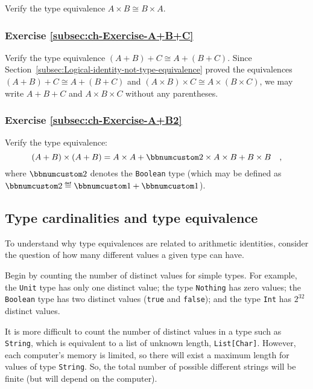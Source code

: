 Verify the type equivalence $A\times B\cong B\times A$.

\subsubsection{Exercise \label{subsec:ch-Exercise-A+B+C}\ref{subsec:ch-Exercise-A+B+C}}

Verify the type equivalence $\left(A+B\right)+C\cong A+\left(B+C\right)$.
Since Section~\ref{subsec:Logical-identity-not-type-equivalence}
proved the equivalences $\left(A+B\right)+C\cong A+\left(B+C\right)$
and $\left(A\times B\right)\times C\cong A\times\left(B\times C\right)$,
we may write $A+B+C$ and $A\times B\times C$ without any parentheses.

\subsubsection{Exercise \label{subsec:ch-Exercise-A+B2}\ref{subsec:ch-Exercise-A+B2}}

Verify the type equivalence:
\[
\left(A+B\right)\times\left(A+B\right)=A\times A+\bbnum 2\times A\times B+B\times B\quad,
\]
where $\bbnum 2$ denotes the \lstinline!Boolean! type
(which may be defined as $\bbnum 2\triangleq\bbnum 1+\bbnum 1$).

\subsection{Type cardinalities and type equivalence}

To understand why type equivalences are related to arithmetic identities,
consider the question of how many different values a given type can
have.

Begin by counting the number of distinct values for simple types.
For example, the \lstinline!Unit! type has only one distinct value;
the type \lstinline!Nothing! has zero values; the \lstinline!Boolean!
type has two distinct values (\lstinline!true! and \lstinline!false!);
and the type \lstinline!Int! has $2^{32}$ distinct values.

It is more difficult to count the number of distinct values in a type
such as \lstinline!String!, which is equivalent to a list of unknown
length, \lstinline!List[Char]!. However, each computer\textsf{'}s memory is
limited, so there will exist a maximum length for values of type \lstinline!String!.
So, the total number of possible different strings will be finite
(but will depend on the computer).

